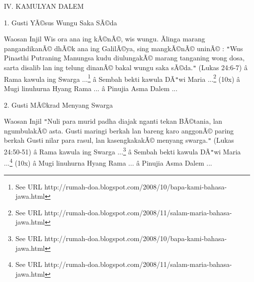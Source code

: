 IV. KAMULYAN DALEM
\newline


1. Gusti Y\~A\copyright{}sus Wungu Saka S\~A\copyright{}da

\newline


Waosan Injil
Wis ora ana ing k\~A\copyright{}n\~A\copyright{}, wis wungu. \~Alinga marang pangandikan\~A\copyright{} dh\~A\copyright{}k ana ing Galil\~A\copyright{}ya, sing mangk\~A\copyright{}n\~A\copyright{} unin\~A\copyright{} : \texttt{{}"{}}Wus Pinasthi Putraning Manungsa kudu diulungak\~A\copyright{} marang tanganing wong dosa, sarta disalib lan ing telung dinan\~A\copyright{} bakal wungu saka s\~A\copyright{}da.\texttt{{}"{}} (Lukas 24:6-7)
\newline
 \^a\*  Rama kawula ing Swarga ...\footnote{See URL http://rumah-doa.blogspot.com/2008/10/bapa-kami-bahasa-jawa.html}\newline
 \^a\*  Sembah bekti kawula D\~A\texttt{{}"{}}wi Maria ...\footnote{See URL http://rumah-doa.blogspot.com/2008/11/salam-maria-bahasa-jawa.html} (10x)\newline
 \^a\*  Mugi linuhurna Hyang Rama ...\newline
 \^a\*  Pinujia Asma Dalem ...\newline


2. Gusti M\~A\copyright{}krad Menyang Swarga

\newline


Waosan Injil
\texttt{{}"{}}Nuli para murid padha diajak nganti tekan B\~A\copyright{}tania, lan ngumbulak\~A\copyright{} asta. Gusti maringi berkah lan bareng karo anggon\~A\copyright{} paring berkah Gusti nilar para rasul, lan kasengkakak\~A\copyright{} menyang swarga.\texttt{{}"{}} (Lukas 24:50-51)
\newline
 \^a\*  Rama kawula ing Swarga ...\footnote{See URL http://rumah-doa.blogspot.com/2008/10/bapa-kami-bahasa-jawa.html}\newline
 \^a\*  Sembah bekti kawula D\~A\texttt{{}"{}}wi Maria ...\footnote{See URL http://rumah-doa.blogspot.com/2008/11/salam-maria-bahasa-jawa.html} (10x)\newline
 \^a\*  Mugi linuhurna Hyang Rama ...\newline
 \^a\*  Pinujia Asma Dalem ...\newline

